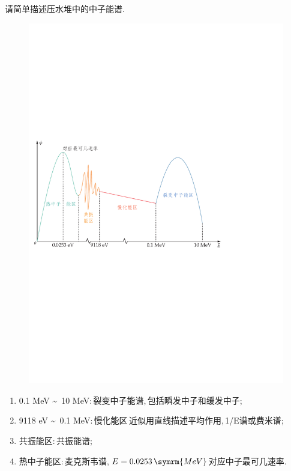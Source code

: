 \begin{exercise}
    请简单描述压水堆中的中子能谱.\,
    \begin{solution}
        \begin{figure}[H]
            \centering
            \includegraphics[scale=0.6]{figures/fig5.1.pdf}
        \end{figure}
        \begin{enumerate}[(1)]
            \item 0.1 MeV \textasciitilde \, 10 MeV:\,裂变中子能谱,\,包括瞬发中子和缓发中子;\,
            \item 9118 eV \textasciitilde \, 0.1 MeV:\,慢化能区\,近似用直线描述平均作用,\,1/E谱或费米谱;\,
            \item 共振能区:\,共振能谱;\,
            \item 热中子能区:\,麦克斯韦谱,\,$E=0.0253\,\symrm{MeV}$对应中子最可几速率.\,
        \end{enumerate}
    \end{solution}
\end{exercise}

